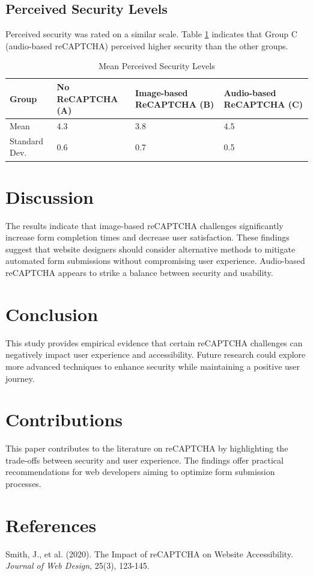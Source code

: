 \documentclass{article}
\begin{document}
\subsection{Perceived Security Levels}
Perceived security was rated on a similar scale. Table \ref{tab:security_levels} indicates that Group C (audio-based reCAPTCHA) perceived higher security than the other groups.

\begin{table}[ht]
\centering
\caption{Mean Perceived Security Levels}
\label{tab:security_levels}
\begin{tabular}{@{}llll@{}}
\toprule
\textbf{Group} & \textbf{No ReCAPTCHA (A)} & \textbf{Image-based ReCAPTCHA (B)} & \textbf{Audio-based ReCAPTCHA (C)} \\ \midrule
Mean          & 4.3                       & 3.8                                  & 4.5                                 \\
Standard Dev. & 0.6                       & 0.7                                   & 0.5                                  \\ \bottomrule
\end{tabular}
\end{table}

\section{Discussion}
The results indicate that image-based reCAPTCHA challenges significantly increase form completion times and decrease user satisfaction. These findings suggest that website designers should consider alternative methods to mitigate automated form submissions without compromising user experience. Audio-based reCAPTCHA appears to strike a balance between security and usability.

\section{Conclusion}
This study provides empirical evidence that certain reCAPTCHA challenges can negatively impact user experience and accessibility. Future research could explore more advanced techniques to enhance security while maintaining a positive user journey.

\section{Contributions}
This paper contributes to the literature on reCAPTCHA by highlighting the trade-offs between security and user experience. The findings offer practical recommendations for web developers aiming to optimize form submission processes.

\section*{References}
Smith, J., et al. (2020). The Impact of reCAPTCHA on Website Accessibility. \textit{Journal of Web Design}, 25(3), 123-145.
\end{document}
